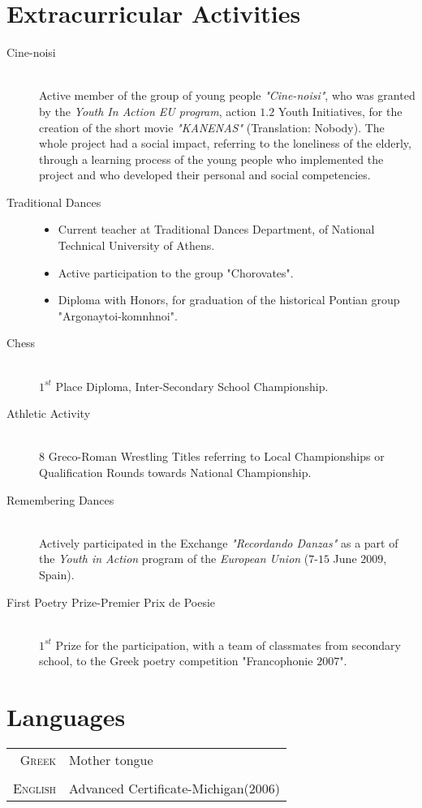 \documentclass[a4paper,10pt]{article}
\begin{document}
\section{Extracurricular Activities}
\begin{description}
\item[Cine-noisi] \hfill \\
Active member of the group of young people \emph{"Cine-noisi"}, who was granted by the \emph{Youth In Action EU program}, action $1.2$ Youth Initiatives, for the creation of the short movie \emph{"KANENAS"} (Translation: Nobody). The whole project had a social impact, referring to the loneliness of the elderly, through a learning process of the young people who implemented the project and who developed their personal and social competencies.
\item[Traditional Dances] \hfill 
\begin{itemize}
\item Current teacher at Traditional Dances Department, of National Technical University of Athens.
\item Active participation to the group "Chorovates".
\item Diploma with Honors, for graduation of the historical Pontian group "Argonaytoi-komnhnoi".
\end{itemize}
\item[Chess] \hfill \\
$1^{st}$ Place Diploma, Inter-Secondary School Championship.
\item[Athletic Activity] \hfill \\
8 Greco-Roman Wrestling Titles referring to Local Championships or Qualification Rounds towards National Championship.
\item[Remembering Dances] \hfill \\
Actively participated in the Exchange \emph{"Recordando Danzas"} as a part of the \emph{Youth in Action} program of the \emph{European Union} ($7$-$15$ June $2009$, Spain).
\item[First Poetry Prize-Premier Prix de Poesie] \hfill \\
$1^{st}$ Prize for the participation, with a team of classmates from secondary school, to the Greek poetry competition "Francophonie $2007$".
\end{description}

\section{Languages}
\begin{tabular}{r|p{11cm}}	
\textsc{Greek} & Mother tongue\\\multicolumn{2}{c}{}\\
\textsc{English} & Advanced Certificate-Michigan($2006$)
\end{tabular}
\end{document}
